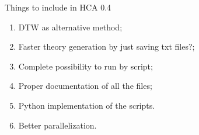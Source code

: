 \documentclass{article}
\begin{document}
Things to include in HCA 0.4

\begin{enumerate}
\item DTW as alternative method;
\item Faster theory generation by just saving txt files?;
\item Complete possibility to run by script;
\item Proper documentation of all the files;
\item Python implementation of the scripts.
\item Better parallelization.
\end{enumerate}
\end{document}

